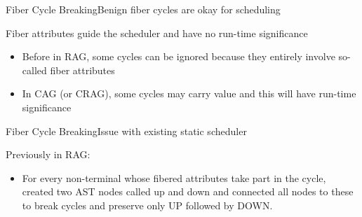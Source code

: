% 

\begin{frame}{Fiber Cycle Breaking}{Benign fiber cycles are okay for scheduling}

\alert{Fiber attributes} guide the scheduler and have no run-time significance

\newlinevspace

\begin{itemize}
    \item %
Before in RAG, some cycles can be ignored because they entirely involve so-called fiber attributes

\newlinevspace

    \item In CAG (or CRAG), some cycles may \alert{carry value} and this will have run-time significance
\end{itemize}
\end{frame}




\begin{frame}{Fiber Cycle Breaking}{Issue with existing static scheduler}

Previously in RAG:
\begin{itemize}
    \item For every non-terminal whose fibered attributes take part in the cycle, created two \alert{AST nodes} called up and down and connected all nodes to these to break cycles and \alert{preserve only UP followed by DOWN}.
\end{itemize}


\end{frame}




